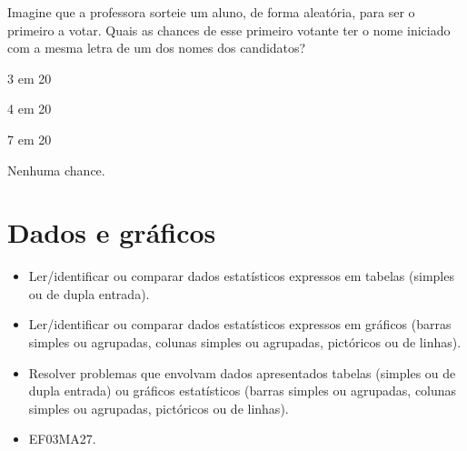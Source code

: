 Imagine que a professora sorteie um aluno, de forma aleatória, para ser o primeiro a votar. Quais as chances de esse primeiro votante ter o nome iniciado com a mesma letra de um dos nomes dos candidatos?

\begin{escolha}
\item
3 em 20
\item
4 em 20
\item
7 em 20
\item
Nenhuma chance.
\end{escolha}

\chapter{Dados e gráficos}


\begin{itemize}
\item Ler/identificar ou comparar dados estatísticos expressos em tabelas
(simples ou de dupla entrada).

\item Ler/identificar ou comparar dados estatísticos expressos em gráficos
(barras simples ou agrupadas, colunas simples ou agrupadas, pictóricos
ou de linhas).

\item Resolver problemas que envolvam dados apresentados tabelas (simples ou
de dupla entrada) ou gráficos estatísticos (barras simples ou agrupadas,
colunas simples ou agrupadas, pictóricos ou de linhas).
\end{itemize}


\begin{itemize}
  \item 
 EF03MA27.
\end{itemize}

